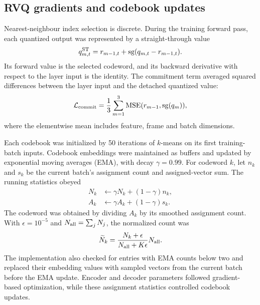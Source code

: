\subsection{RVQ gradients and codebook updates}
Nearest-neighbour index selection is discrete. During the training forward pass, each quantized output was represented by a straight-through value
\begin{equation}
 q^{\rm ST}_{m,t}
 =r_{m-1,t}+\operatorname{sg}(q_{m,t}-r_{m-1,t}).
 \label{eq:sv2-ste}
\end{equation}
Its forward value is the selected codeword, and its backward derivative with respect to the layer input is the identity. The commitment term averaged squared differences between the layer input and the detached quantized value:
\begin{equation}
 \mathcal L_{\rm commit}
 =\frac{1}{3}\sum_{m=1}^{3}
   \operatorname{MSE}(r_{m-1},\operatorname{sg}(q_m)),
 \label{eq:sv2-commit}
\end{equation}
where the elementwise mean includes feature, frame and batch dimensions.

Each codebook was initialized by 50 iterations of $k$-means on its first training-batch inputs. Codebook embeddings were maintained as buffers and updated by exponential moving averages (EMA), with decay $\gamma=0.99$. For codeword $k$, let $n_k$ and $s_k$ be the current batch's assignment count and assigned-vector sum. The running statistics obeyed
\begin{align}
 N_k&\leftarrow\gamma N_k+(1-\gamma)n_k,\nonumber\\
 A_k&\leftarrow\gamma A_k+(1-\gamma)s_k.
 \label{eq:sv2-ema}
\end{align}
The codeword was obtained by dividing $A_k$ by its smoothed assignment count. With $\epsilon=10^{-5}$ and $N_{\rm all}=\sum_jN_j$, the normalized count was
\begin{equation}
 \widetilde N_k=
 \frac{N_k+\epsilon}{N_{\rm all}+K\epsilon}N_{\rm all}.
 \label{eq:sv2-ema-count}
\end{equation}
The implementation also checked for entries with EMA counts below two and replaced their embedding values with sampled vectors from the current batch before the EMA update. Encoder and decoder parameters followed gradient-based optimization, while these assignment statistics controlled codebook updates.

